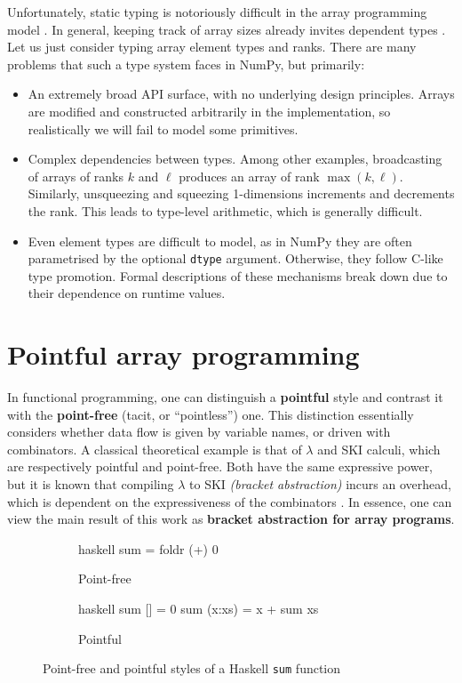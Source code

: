Unfortunately, static typing is notoriously difficult in the array programming model \cite{liu2020type}. In general, keeping track of array sizes already invites dependent types \cite{henriksen2021towards}. Let us just consider typing array element types and ranks. There are many problems that such a type system faces in NumPy, but primarily:
\begin{itemize}
    \item An extremely broad API surface, with no underlying design principles. Arrays are modified and constructed arbitrarily in the implementation, so realistically we will fail to model some primitives.
    \item Complex dependencies between types. Among other examples, broadcasting of arrays of ranks $k$ and $\ell$ produces an array of rank $\max(k, \ell)$. Similarly, unsqueezing and squeezing 1-dimensions increments and decrements the rank. This leads to type-level arithmetic, which is generally difficult.
    \item Even element types are difficult to model, as in NumPy they are often parametrised by the optional \texttt{dtype} argument. Otherwise, they follow C-like type promotion. Formal descriptions of these mechanisms break down due to their  dependence on runtime values.
\end{itemize}

\section{Pointful array programming}
\label{pointful-array-programming}

In functional programming, one can distinguish a \textbf{pointful} style and contrast it with the \textbf{point-free} (tacit, or ``pointless'') one. This distinction essentially considers whether data flow is given by variable names, or driven with combinators. A classical theoretical example is that of $\lambda$ and SKI calculi, which are respectively pointful and point-free. Both have the same expressive power, but it is known that compiling $\lambda$ to SKI \textit{(bracket abstraction)} incurs an overhead, which is dependent on the expressiveness of the combinators \cite{lachowski2018complexity}. 
In essence, one can view the main result of this work as \textbf{bracket abstraction for array programs}.

\begin{figure}[h]
\centering
\begin{subfigure}{.3\textwidth}
  \centering
    \begin{cminted}{haskell}
sum = foldr (+) 0
    \end{cminted}
      \caption{Point-free}
\end{subfigure}%
\begin{subfigure}{.3\textwidth}
  \centering
  \begin{cminted}{haskell}
sum [] = 0
sum (x:xs) = x + sum xs
  \end{cminted}
  \caption{Pointful}
\end{subfigure}
\caption{Point-free and pointful styles of a Haskell \texttt{sum} function}
\label{fig:point-haskell}
\end{figure}

